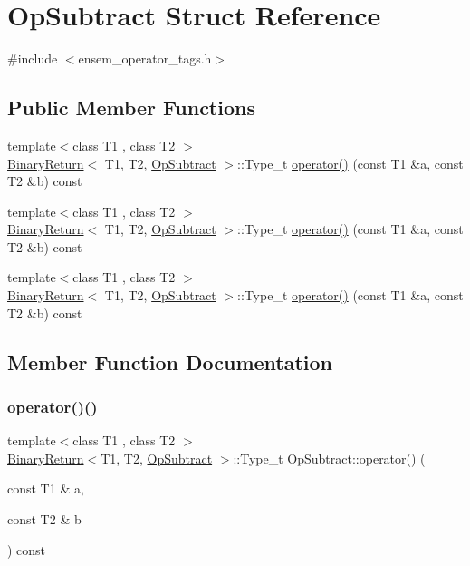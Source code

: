 \hypertarget{structOpSubtract}{}\section{Op\+Subtract Struct Reference}
\label{structOpSubtract}


{\ttfamily \#include $<$ensem\+\_\+operator\+\_\+tags.\+h$>$}

\subsection*{Public Member Functions}
\begin{DoxyCompactItemize}
\item 
{\footnotesize template$<$class T1 , class T2 $>$ }\\\mbox{\hyperlink{structBinaryReturn}{Binary\+Return}}$<$ T1, T2, \mbox{\hyperlink{structOpSubtract}{Op\+Subtract}} $>$\+::Type\+\_\+t \mbox{\hyperlink{structOpSubtract_a977cd29c1df947e7958b86dd98eee321}{operator()}} (const T1 \&a, const T2 \&b) const
\item 
{\footnotesize template$<$class T1 , class T2 $>$ }\\\mbox{\hyperlink{structBinaryReturn}{Binary\+Return}}$<$ T1, T2, \mbox{\hyperlink{structOpSubtract}{Op\+Subtract}} $>$\+::Type\+\_\+t \mbox{\hyperlink{structOpSubtract_a977cd29c1df947e7958b86dd98eee321}{operator()}} (const T1 \&a, const T2 \&b) const
\item 
{\footnotesize template$<$class T1 , class T2 $>$ }\\\mbox{\hyperlink{structBinaryReturn}{Binary\+Return}}$<$ T1, T2, \mbox{\hyperlink{structOpSubtract}{Op\+Subtract}} $>$\+::Type\+\_\+t \mbox{\hyperlink{structOpSubtract_a977cd29c1df947e7958b86dd98eee321}{operator()}} (const T1 \&a, const T2 \&b) const
\end{DoxyCompactItemize}


\subsection{Member Function Documentation}
\mbox{\label{structOpSubtract_a977cd29c1df947e7958b86dd98eee321}} 
\subsubsection{\texorpdfstring{operator()()}{operator()()}\hspace{0.1cm}{\footnotesize\ttfamily [1/3]}}
{\footnotesize\ttfamily template$<$class T1 , class T2 $>$ \\
\mbox{\hyperlink{structBinaryReturn}{Binary\+Return}}$<$T1, T2, \mbox{\hyperlink{structOpSubtract}{Op\+Subtract}} $>$\+::Type\+\_\+t Op\+Subtract\+::operator() (\begin{DoxyParamCaption}\item[{const T1 \&}]{a,  }\item[{const T2 \&}]{b }\end{DoxyParamCaption}) const\hspace{0.3cm}{\ttfamily [inline]}}

